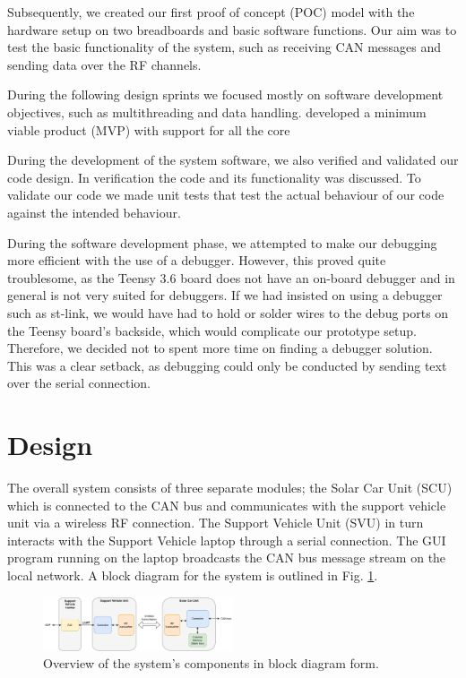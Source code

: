 \documentclass[conference]{IEEEtran}
\begin{document}
Subsequently, we created our first proof of concept (POC) model with the hardware setup on two breadboards and basic software functions. Our aim was to test the basic functionality of the system, such as receiving CAN messages and sending data over the RF channels. 

During the following design sprints we focused mostly on software development objectives, such as multithreading and data handling. developed a minimum viable product (MVP) with support for all the core  

During the development of the system software, we also verified and validated our code design. In verification the code and its functionality was discussed. To validate our code we made unit tests that test the actual behaviour of our code against the intended behaviour.

During the software development phase, we attempted to make our debugging more efficient with the use of a debugger. However, this proved quite troublesome, as the Teensy 3.6 board does not have an on-board debugger and in general is not very suited for debuggers. If we had insisted on using a debugger such as st-link, we would have had to hold or solder wires to the debug ports on the Teensy board's backside, which would complicate our prototype setup. Therefore, we decided not to spent more time on finding a debugger solution. This was a clear setback, as debugging could only be conducted by sending text over the serial connection.

\section{Design}
The overall system consists of three separate modules; the Solar Car Unit (SCU) which is connected to the CAN bus and communicates with the support vehicle unit via a wireless RF connection. The Support Vehicle Unit (SVU) in turn interacts with the Support Vehicle laptop through a serial connection. The GUI program running on the laptop broadcasts the CAN bus message stream on the local network. A block diagram for the system is outlined in Fig. \ref{fig:schematic}. 
\begin{figure}[H]
    \centering
    \includegraphics[width=0.5\textwidth]{documentation/images/SystemSchematic.pdf}
    \caption{Overview of the system's components in block diagram form.}
    \label{fig:schematic}
\end{figure}
\end{document}

